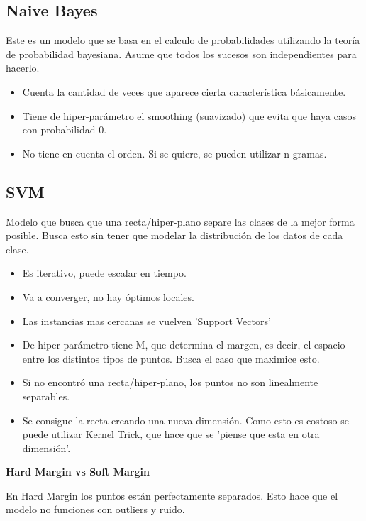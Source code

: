 \documentclass[titlepage,a4paper]{article}
\begin{document}


\subsection{Naive Bayes}
Este es un modelo que se basa en el calculo de probabilidades utilizando la teoría de probabilidad bayesiana. Asume que todos los sucesos son independientes para hacerlo.

\begin{itemize}
    \item Cuenta la cantidad de veces que aparece cierta característica básicamente.
    \item Tiene de hiper-parámetro el smoothing (suavizado) que evita que haya casos con probabilidad 0.
    \item No tiene en cuenta el orden. Si se quiere, se pueden utilizar n-gramas.
    
\end{itemize}


\subsection{SVM}

Modelo que busca que una recta/hiper-plano separe las clases de la mejor forma posible. Busca esto sin tener que modelar la distribución de los datos de cada clase.

\begin{itemize}
    \item Es iterativo, puede escalar en tiempo.
    \item Va a converger, no hay óptimos locales.
    \item Las instancias mas cercanas se vuelven 'Support Vectors'
    \item De hiper-parámetro tiene M, que determina el margen, es decir, el espacio entre los distintos tipos de puntos. Busca el caso que maximice esto.
    \item Si no encontró una recta/hiper-plano, los puntos no son linealmente separables.
    \item Se consigue la recta creando una nueva dimensión. Como esto es costoso se puede utilizar Kernel Trick, que hace que se 'piense que esta en otra dimensión'.
\end{itemize}

\textbf{Hard Margin vs Soft Margin}

En Hard Margin los puntos están perfectamente separados. Esto hace que el modelo no funciones con outliers y ruido.
\end{document}

